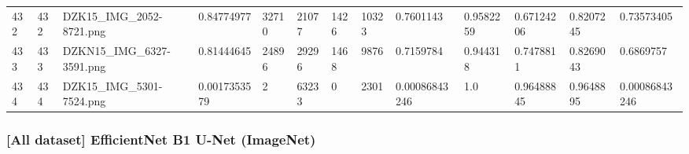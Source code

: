 \documentclass[11pt, a4paper, twoside]{report}
\begin{document}
\begin{longtable}[c]{@{}lllllllllllll@{}}
432 & 432 & DZK15\_IMG\_2052-8721.png & 0.84774977 & 32710 & 21077 & 1426 & 10323 & 0.7601143 & 0.9582259 & 0.67124206 & 0.8207245 & 0.73573405 \\
433 & 433 & DZKN15\_IMG\_6327-3591.png & 0.81444645 & 24896 & 29296 & 1468 & 9876 & 0.7159784 & 0.944318 & 0.7478811 & 0.8269043 & 0.6869757 \\
434 & 434 & DZK15\_IMG\_5301-7524.png & 0.0017353579 & 2 & 63233 & 0 & 2301 & 0.00086843246 & 1.0 & 0.96488845 & 0.9648895 & 0.00086843246 \\* \bottomrule
\end{longtable}

\newpage

\subsubsection{[All dataset] EfficientNet B1 U-Net (ImageNet)}
\end{document}

